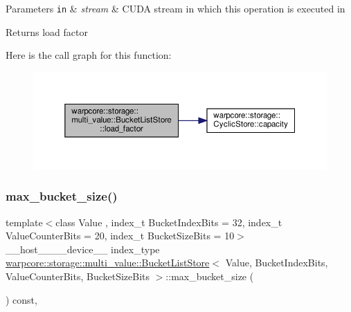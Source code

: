 \begin{DoxyParams}[1]{Parameters}
\mbox{\tt in}  & {\em stream} & C\+U\+DA stream in which this operation is executed in \\
\hline
\end{DoxyParams}
\begin{DoxyReturn}{Returns}
load factor 
\end{DoxyReturn}
Here is the call graph for this function\+:
\nopagebreak
\begin{figure}[H]
\begin{center}
\leavevmode
\includegraphics[width=350pt]{classwarpcore_1_1storage_1_1multi__value_1_1BucketListStore_a195a0df8c935bf26300d2939cbd04b0f_cgraph}
\end{center}
\end{figure}
\mbox{\label{classwarpcore_1_1storage_1_1multi__value_1_1BucketListStore_aa3160abbdf2196314e3cd0e2e2d5a47a}} 
\subsubsection{\texorpdfstring{max\+\_\+bucket\+\_\+size()}{max\_bucket\_size()}}
{\footnotesize\ttfamily template$<$class Value , index\+\_\+t Bucket\+Index\+Bits = 32, index\+\_\+t Value\+Counter\+Bits = 20, index\+\_\+t Bucket\+Size\+Bits = 10$>$ \\
\+\_\+\+\_\+host\+\_\+\+\_\+\+\_\+\+\_\+device\+\_\+\+\_\+ index\+\_\+type \hyperlink{classwarpcore_1_1storage_1_1multi__value_1_1BucketListStore}{warpcore\+::storage\+::multi\+\_\+value\+::\+Bucket\+List\+Store}$<$ Value, Bucket\+Index\+Bits, Value\+Counter\+Bits, Bucket\+Size\+Bits $>$\+::max\+\_\+bucket\+\_\+size (\begin{DoxyParamCaption}{ }\end{DoxyParamCaption}) const\hspace{0.3cm}{\ttfamily [inline]}, {\ttfamily [noexcept]}}



